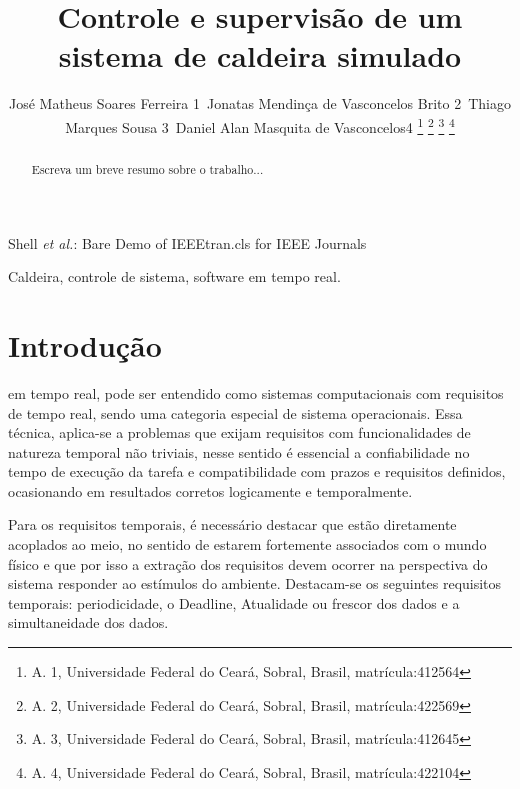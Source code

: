 \documentclass[journal]{IEEEtran}
\begin{document}
	
\title{Controle e supervisão de um sistema de caldeira simulado}

\author{José Matheus Soares Ferreira 1~Jonatas Mendinça de Vasconcelos Brito 2~Thiago Marques Sousa 3~Daniel Alan Masquita de Vasconcelos4%
\thanks{A. 1, Universidade Federal do Ceará, Sobral, Brasil, matrícula:412564}%
\thanks{A. 2, Universidade Federal do Ceará, Sobral, Brasil, matrícula:422569}%
\thanks{A. 3, Universidade Federal do Ceará, Sobral, Brasil, matrícula:412645}%
\thanks{A. 4, Universidade Federal do Ceará, Sobral, Brasil, matrícula:422104}
}

%
{Shell \MakeLowercase{\textit{et al.}}: Bare Demo of IEEEtran.cls for IEEE Journals}


\maketitle

\begin{abstract}
Escreva um breve resumo sobre o trabalho...
\end{abstract}

\begin{IEEEkeywords}
Caldeira, controle de sistema, software em tempo real.
\end{IEEEkeywords}

\IEEEpeerreviewmaketitle

\section{Introdução}


 em tempo real, pode ser entendido como sistemas computacionais com requisitos de tempo real, sendo uma categoria especial de sistema operacionais. Essa técnica, aplica-se a problemas que exijam requisitos com funcionalidades de natureza temporal não triviais, nesse sentido é essencial a confiabilidade no tempo de execução da tarefa e compatibilidade com prazos e requisitos definidos, ocasionando em resultados corretos logicamente e temporalmente.\cite{IEEEhowto:romulo}

Para os requisitos temporais, é necessário destacar que estão diretamente acoplados ao meio, no sentido de estarem fortemente associados com o mundo físico e que por isso a extração dos requisitos devem ocorrer na perspectiva do sistema responder ao estímulos do ambiente. Destacam-se os seguintes requisitos temporais:  periodicidade, o Deadline, Atualidade ou frescor dos dados e a simultaneidade dos dados.\cite{IEEEhowto:romulo}
\end{document}
